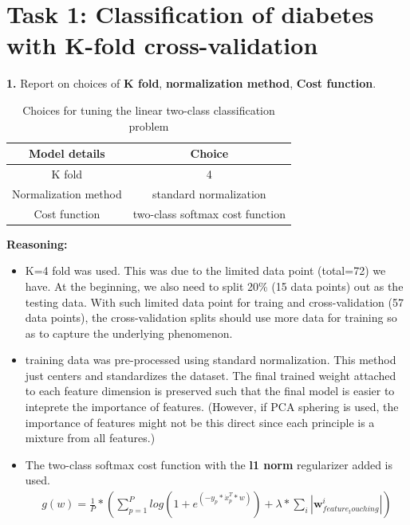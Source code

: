 \setlength\intextsep{1mm}

\section*{\textbf{Task 1: Classification of diabetes with K-fold cross-validation}}

\textbf{1.} Report on choices of \textbf{K fold}, \textbf{normalization method}, \textbf{Cost function}.

\begin{table}[H]
    \centering
    \begin{tabular}{|c|c|}
    \hline
         Model details &  Choice  \\
        \hline
         K fold & 4 \\
         Normalization method & standard normalization   \\
         Cost function & two-class softmax cost function   \\
        \hline
    \end{tabular}
    \caption{Choices for tuning the linear two-class classification problem}
    \label{tab:model choices}
\end{table}

\textbf{Reasoning: }
\begin{itemize}
    \item K=4 fold was used. This was due to the limited data point (total=72) we have. At the beginning, we also need to split 20\% (15 data points) out as the testing data. With such limited data point for traing and cross-validation (57 data points), the cross-validation splits should use more data for training so as to capture the underlying phenomenon.
    \item training data was pre-processed using standard normalization. This method just centers and standardizes the dataset. The final trained weight attached to each feature dimension is preserved such that the final model is easier to inteprete the importance of features. (However, if PCA sphering is used, the importance of features might not be this direct since each principle is a mixture from all features.)
    \item The two-class softmax cost function with the \textbf{l1 norm} regularizer added is used.
    \begin{align*}
        g(w) = \frac{1}{P} * ( \sum_{p=1}^{P} log (1+e^{(-y_p * \dot{x}_p^T *w)}) + \lambda * \sum_{i}  | \textbf{w}_{feature_touching}^i | )
    \end{align*} 
\end{itemize}

